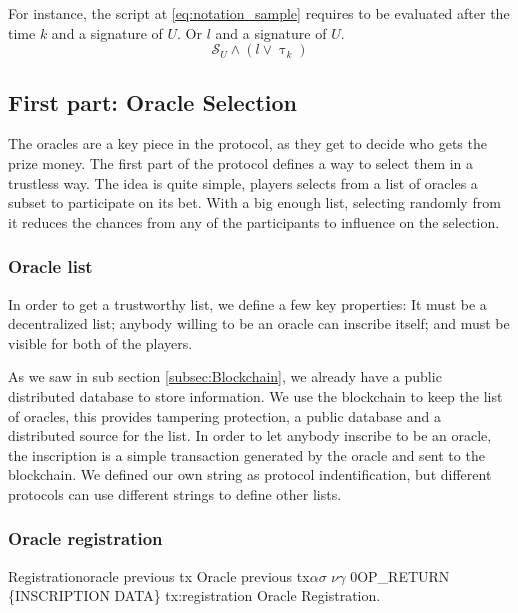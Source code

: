 For instance, the script at \ref{eq:notation_sample} requires to be evaluated
  after the time $k$ and a signature of $U$. Or $l$ and a signature of $U$.
\begin{equation} \label{eq:notation_sample}
    \mathcal{S}_U \wedge (l \vee \uptau_k)
\end{equation}
\mathmode

\subsection{First part: Oracle Selection}

The oracles are a key piece in the protocol, as they get to decide who gets
  the prize money.
The first part of the protocol defines a way to select them in a trustless
  way.
The idea is quite simple, players selects from a list of oracles a subset
  to participate on its bet.
With a big enough list, selecting randomly from it reduces the
  chances from any of the participants to influence on the selection.

\subsubsection{Oracle list}

In order to get a trustworthy list, we define a few key properties:
It must be a decentralized list; anybody willing to be an oracle can inscribe
  itself; and must be visible for both of the players.

As we saw in sub section \ref{subsec:Blockchain}, we already have a
  public distributed database to store information.
We use the blockchain to keep the list of oracles, this provides tampering
  protection, a public database and a distributed source for the list.
In order to let anybody inscribe to be an oracle, the inscription is a simple
 transaction generated by the oracle and sent to the blockchain.
We defined our own string as protocol indentification, but different protocols
  can use different strings to define other lists.

\subsubsection{Oracle registration}

\transaction
    {Registration}{oracle previous tx}
      {Oracle previous tx}{$\alpha$}{$\sigma$}
      \stopinputs
      {$\nu$}{$\gamma$}
      {$0$}{OP\_RETURN \{INSCRIPTION DATA\}}
      \stopoutputs
      {tx:registration}
      {Oracle Registration.}

